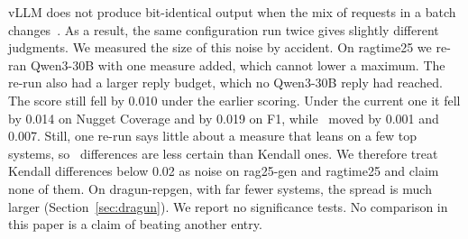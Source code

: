 vLLM does not produce
bit-identical output when the mix of requests in a batch
changes~\cite{he2025nondeterminism}. As a result, the same configuration run twice
gives slightly different judgments. We measured the size of
this noise by accident. On ragtime25 we re-ran Qwen3-30B with one measure added,
which cannot lower a maximum. The re-run also had a larger reply budget, which no
Qwen3-30B reply had reached. The score still fell by 0.010 under the earlier
scoring. Under the current one it fell by 0.014 on Nugget Coverage and by 0.019 on
F1, while \tauap\ moved by 0.001 and 0.007. Still, one re-run says little about a measure that leans on a few top systems, so \tauap\ differences are less certain than Kendall ones. We therefore treat Kendall differences
below 0.02 as noise on rag25-gen and ragtime25 and claim none of them. On
dragun-repgen, with far fewer systems, the spread is much larger
(Section~\ref{sec:dragun}). We report no significance tests. No comparison in this
paper is a claim of beating another entry.
